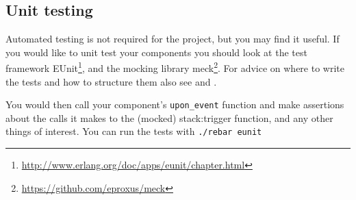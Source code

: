 \documentclass[a4paper]{article}
\begin{document}

\subsection{Unit testing} %
\label{sub:unit_testing}

Automated testing is not required for the project, but you may find it useful.
If you would like to unit test your components you should look at the test
framework
EUnit\footnote{\url{http://www.erlang.org/doc/apps/eunit/chapter.html}}, and
the mocking library meck\footnote{\url{https://github.com/eproxus/meck}}. For
advice on where to write the tests and how to structure them also see
\cite{mochimedia_test} and \cite{so_eunit_q}.

You would then call your component's \verb!upon_event! function and make
assertions about the calls it makes to the (mocked) stack:trigger function,
and any other things of interest. You can run the tests with
\verb!./rebar eunit!


\end{document}
